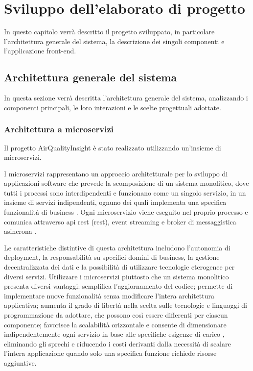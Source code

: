 \clearpage{\pagestyle{empty}\cleardoublepage}
\chapter{Sviluppo dell'elaborato di progetto}
\label{chapter:third}

In questo capitolo verrà descritto il progetto sviluppato, in particolare l'architettura generale del sistema,
la descrizione dei singoli componenti e l'applicazione front-end.

\section{Architettura generale del sistema}

In questa sezione verrà descritta l'architettura generale del sistema, analizzando i componenti principali,
le loro interazioni e le scelte progettuali adottate.

\subsection{Architettura a microservizi}

Il progetto AirQualityInsight è stato realizzato utilizzando un'insieme di microservizi.

I microservizi rappresentano un approccio architetturale per lo sviluppo di applicazioni software che prevede
la scomposizione di un sistema monolitico, dove tutti i processi sono interdipendenti e funzionano come un singolo
servizio, in un insieme di servizi indipendenti, ognuno dei quali implementa una specifica funzionalità
di business \cite{newman2015building}. Ogni microservizio viene eseguito nel proprio processo e comunica attraverso
\acrshort{api} \acrshort{rest} (\acrlong{rest}), event streaming e broker di messaggistica asincrona
\cite{fowler2014microservices}.

Le caratteristiche distintive di questa architettura includono l'autonomia di deployment, la responsabilità
su specifici domini di business, la gestione decentralizzata dei dati e la possibilità di utilizzare
tecnologie eterogenee per diversi servizi. Utilizzare i microservizi piuttosto che un sistema monolitico
presenta diversi vantaggi: semplifica l'aggiornamento del codice; permette di implementare nuove funzionalità
senza modificare l'intera architettura applicativa; aumenta il grado di libertà nella scelta sulle
tecnologie e linguaggi di programmazione da adottare, che possono così essere differenti per ciascun componente;
favorisce la scalabilità orizzontale e consente di dimensionare indipendentemente ogni servizio
in base alle specifiche esigenze di carico \cite{dragoni2017microservices}, eliminando gli sprechi e riducendo i costi
derivanti dalla necessità di scalare l'intera applicazione quando solo una specifica funzione
richiede risorse aggiuntive.

